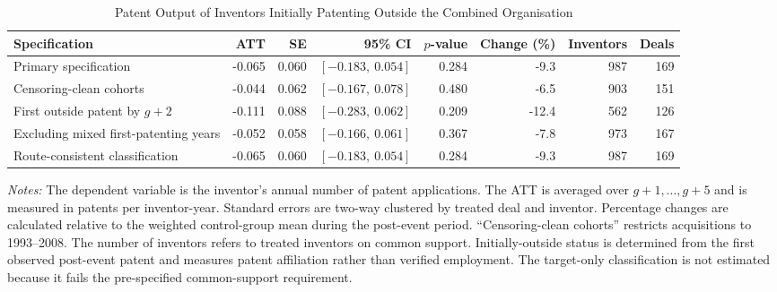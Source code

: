 \begin{table}[!htbp]
    \centering
    \caption{Patent Output of Inventors Initially Patenting Outside the Combined Organisation}
    \label{tab:initially_outside_productivity}
    \begin{threeparttable}
        \small
        \renewcommand{\arraystretch}{1.08}
        \begin{tabular*}{\textwidth}{@{\extracolsep{\fill}}lrrrrrrr@{}}
            \toprule
            Specification
            & ATT
            & SE
            & 95\% CI
            & \(p\)-value
            & Change (\%)
            & Inventors
            & Deals \\
            \midrule
            Primary specification
            & -0.065 & 0.060 & \([-0.183,\ 0.054]\)
            & 0.284 & -9.3 & 987 & 169 \\
            Censoring-clean cohorts
            & -0.044 & 0.062 & \([-0.167,\ 0.078]\)
            & 0.480 & -6.5 & 903 & 151 \\
            First outside patent by \(g+2\)
            & -0.111 & 0.088 & \([-0.283,\ 0.062]\)
            & 0.209 & -12.4 & 562 & 126 \\
            Excluding mixed first-patenting years
            & -0.052 & 0.058 & \([-0.166,\ 0.061]\)
            & 0.367 & -7.8 & 973 & 167 \\
            Route-consistent classification
            & -0.065 & 0.060 & \([-0.183,\ 0.054]\)
            & 0.284 & -9.3 & 987 & 169 \\
            \bottomrule
        \end{tabular*}
        \begin{tablenotes}[flushleft]
            \footnotesize
            \item \textit{Notes:} The dependent variable is the inventor's
            annual number of patent applications. The ATT is averaged over
            \(g+1,\ldots,g+5\) and is measured in patents per inventor-year.
            Standard errors are two-way clustered by treated deal and
            inventor. Percentage changes are calculated relative to the
            weighted control-group mean during the post-event period.
            ``Censoring-clean cohorts'' restricts acquisitions to 1993--2008.
            The number of inventors refers to treated inventors on common
            support. Initially-outside status is determined from the first
            observed post-event patent and measures patent affiliation rather
            than verified employment. The target-only classification is not
            estimated because it fails the pre-specified common-support
            requirement.
        \end{tablenotes}
    \end{threeparttable}
\end{table}
